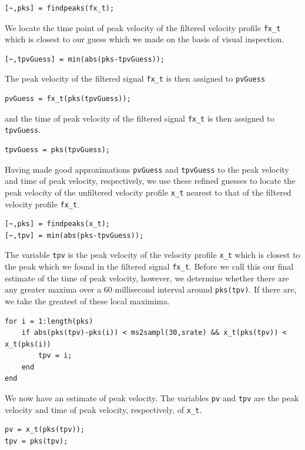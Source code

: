 \documentclass[a4paper, 12pt]{article}
\begin{document}
\begin{verbatim}
[~,pks] = findpeaks(fx_t);
\end{verbatim}
We locate the time point of peak velocity of the filtered velocity profile \texttt{fx\_t} which is closest to our guess which we made on the basis of visual inspection.
\begin{verbatim}
[~,tpvGuess] = min(abs(pks-tpvGuess));
\end{verbatim}
The peak velocity of the filtered signal \texttt{fx\_t} is then assigned to \texttt{pvGuess}
\begin{verbatim}
pvGuess = fx_t(pks(tpvGuess));
\end{verbatim}
and the time of peak velocity of the filtered signal \texttt{fx\_t} is then assigned to \texttt{tpvGuess}.
\begin{verbatim}
tpvGuess = pks(tpvGuess);
\end{verbatim}
Having made good approximations \texttt{pvGuess} and \texttt{tpvGuess} to the peak velocity and time of peak velocity, respectively, we use these refined guesses to locate the peak velocity of the unfiltered velocity profile \texttt{x\_t} nearest to that of the filtered velocity profile \texttt{fx\_t}.
\begin{verbatim}
[~,pks] = findpeaks(x_t);
[~,tpv] = min(abs(pks-tpvGuess));
\end{verbatim}
The variable \texttt{tpv} is the peak velocity of the velocity profile \texttt{x\_t} which is closest to the peak which we found in the filtered signal \texttt{fx\_t}. Before we call this our final estimate of the time of peak velocity, however, we determine whether there are any greater maxima over a 60 millisecond interval around \texttt{pks(tpv)}. If there are, we take the greatest of these local maximima.
\begin{verbatim}
for i = 1:length(pks)
    if abs(pks(tpv)-pks(i)) < ms2sampl(30,srate) && x_t(pks(tpv)) < x_t(pks(i))
        tpv = i;
    end
end
\end{verbatim}
We now have an estimate of peak velocity. The variables \texttt{pv} and \texttt{tpv} are the peak velocity and time of peak velocity, respectively, of \texttt{x\_t}.
\begin{verbatim}
pv = x_t(pks(tpv));
tpv = pks(tpv);
\end{verbatim}
\end{document}
